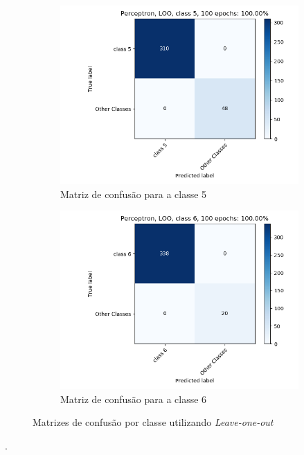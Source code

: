 \documentclass[paper=a4, fontsize=11pt]{scrartcl}
\numberwithin{equation}{section}		%
\numberwithin{figure}{section}			%
\numberwithin{table}{section}				%
\begin{document}
\begin{figure}[h!]
\begin{subfigure}{.5\textwidth}
			\includegraphics[width=\linewidth]{img/q3_fig_loo_classe5.png}
			\caption{Matriz de confusão para a classe 5}
			\label{fig:q1grau6}
		\end{subfigure}%
		\begin{subfigure}{.5\textwidth}
			\centering
			\includegraphics[width=\linewidth]{img/q3_fig_loo_classe6.png}
			\caption{Matriz de confusão para a classe 6}
			\label{fig:q1grau6}
		\end{subfigure}%
		
		\caption{Matrizes de confusão por classe utilizando \textit{Leave-one-out}}
		\label{fig:confusao_loo}
	\end{figure}
	
	\newpage
	.
	\newpage
\end{document}
